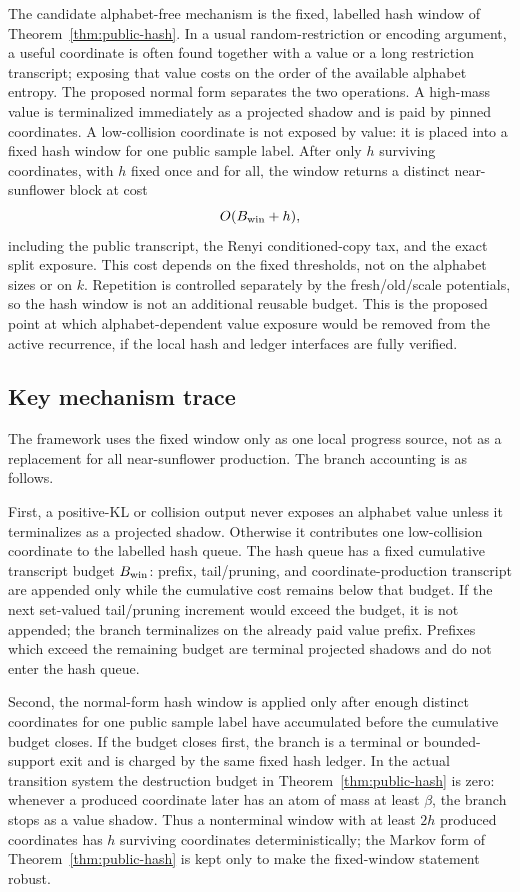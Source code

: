 \documentclass[11pt]{article}
\begin{document}
The candidate alphabet-free mechanism is the fixed, labelled hash window of
Theorem~\ref{thm:public-hash}.  In a usual random-restriction or encoding
argument, a useful coordinate is often found together with a value or a long
restriction transcript; exposing that value costs on the order of the
available alphabet entropy.  The proposed normal form separates the two operations.  A
high-mass value is terminalized immediately as a projected shadow and is paid
by pinned coordinates.  A low-collision coordinate is not exposed by value:
it is placed into a fixed hash window for one public sample label.  After
only $h$ surviving coordinates, with $h$ fixed once and for all, the window
returns a distinct near-sunflower block at cost
\[
  O(B_{\rm win}+h),
\]
including the public transcript, the Renyi conditioned-copy tax, and the exact
split exposure.  This cost depends on the fixed thresholds, not on the
alphabet sizes or on $k$.  Repetition is controlled separately by the
fresh/old/scale potentials, so the hash window is not an additional reusable
budget.  This is the proposed point at which alphabet-dependent value exposure
would be removed from the active recurrence, if the local hash and ledger
interfaces are fully verified.

\subsection*{Key mechanism trace}

The framework uses the fixed window only as one local progress source, not as a
replacement for all near-sunflower production.  The branch accounting is as
follows.

First, a positive-KL or collision output never exposes an alphabet value
unless it terminalizes as a projected shadow.  Otherwise it contributes one
low-collision coordinate to the labelled hash queue.  The hash queue has a
fixed cumulative transcript budget $B_{\rm win}$: prefix, tail/pruning, and
coordinate-production transcript are appended only while the cumulative cost
remains below that budget.  If the next set-valued tail/pruning increment
would exceed the budget, it is not appended; the branch terminalizes on the
already paid value prefix.  Prefixes which exceed the remaining budget are
terminal projected shadows and do not enter the hash queue.

Second, the normal-form hash window is applied only after enough distinct
coordinates for one public sample label have accumulated before the cumulative
budget closes.  If the budget closes first, the branch is a terminal or
bounded-support exit and is charged by the same fixed hash ledger.  In the
actual transition system the destruction budget in Theorem~\ref{thm:public-hash} is zero:
whenever a produced coordinate later has an atom of mass at least $\beta$,
the branch stops as a value shadow.  Thus a nonterminal window with at least
$2h$ produced coordinates has $h$ surviving coordinates deterministically;
the Markov form of Theorem~\ref{thm:public-hash} is kept only to make the
fixed-window statement robust.
\end{document}
